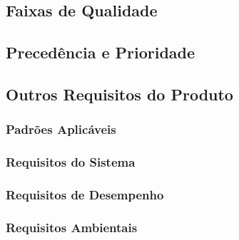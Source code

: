 \subsection{Faixas de Qualidade}

\subsection{Precedência e Prioridade}

\subsection{Outros Requisitos do Produto}

\subsubsection{Padrões Aplicáveis}

\subsubsection{Requisitos do Sistema}

\subsubsection{Requisitos de Desempenho}

\subsubsection{Requisitos Ambientais}

